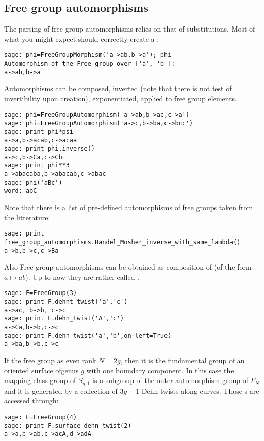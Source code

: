 \documentclass[10pt,a4paper]{article}
\begin{document}
\subsection{Free group automorphisms}

The parsing of free group automorphisms relies on that of
substitutions. Most of what you might expect should correctly create a
:
\begin{verbatim}
sage: phi=FreeGroupMorphism('a->ab,b->a'); phi
Automorphism of the Free group over ['a', 'b']:
a->ab,b->a
\end{verbatim}
Automorphisms can be composed, inverted (note that there is not test
of invertibility upon creation), exponentiated, applied to free group elements.
\begin{verbatim}
sage: phi=FreeGroupAutomorphism('a->ab,b->ac,c->a')
sage: phi=FreeGroupAutomorphism('a->c,b->ba,c->bcc')
sage: print phi*psi
a->a,b->acab,c->acaa
sage: print phi.inverse()
a->c,b->Ca,c->Cb
sage: print phi**3
a->abacaba,b->abacab,c->abac
sage: phi('aBc')
word: abC
\end{verbatim}

Note that there is a list of pre-defined automorphisms of free groups taken from the litterature:
\begin{verbatim}
sage: print free_group_automorphisms.Handel_Mosher_inverse_with_same_lambda()
a->b,b->c,c->Ba
\end{verbatim}

Also Free group automorphisms can be obtained as composition of
 (of the form $a\mapsto
ab$). Up to now they are rather called .
\begin{verbatim}
sage: F=FreeGroup(3)
sage: print F.dehnt_twist('a','c')
a->ac, b->b, c->c
sage: print F.dehn_twist('A','c')
a->Ca,b->b,c->c
sage: print F.dehn_twist('a','b',on_left=True)
a->ba,b->b,c->c
\end{verbatim}

If the free group as even rank $N=2g$, then it is the fundamental
group of an oriented surface ofgenus $g$ with one boundary
component. In this case the mapping class group of $S_{g,1}$ is a
subgroup of the outer automorphism group of $F_N$ and it is generated
by a collection of $3g-1$ Dehn twists along curves. Those s are accessed through:
\begin{verbatim}
sage: F=FreeGroup(4)
sage: print F.surface_dehn_twist(2)
a->a,b->ab,c->acA,d->adA
\end{verbatim}
\end{document}
